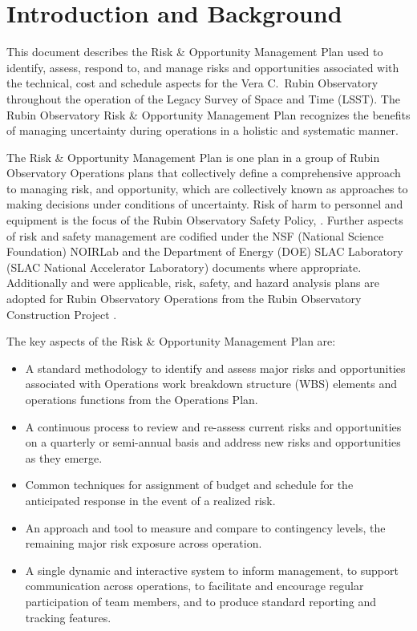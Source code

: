 \section{Introduction and Background}

This document describes the Risk \& Opportunity Management Plan used to identify, assess, respond to, and manage risks and opportunities associated with the technical, cost and schedule aspects for the Vera C.\ Rubin Observatory throughout the operation of the Legacy Survey of Space and Time (LSST).
The Rubin Observatory Risk \& Opportunity Management Plan recognizes the benefits of managing uncertainty during operations in a holistic and systematic manner.

The Risk \& Opportunity Management Plan is one plan in a group of Rubin Observatory Operations plans that collectively define a comprehensive approach to managing risk, and opportunity, which are collectively known as approaches to making decisions under conditions of uncertainty.
Risk of harm to personnel and equipment is the focus of the Rubin Observatory Safety Policy, .
Further aspects of risk and safety management are codified under the NSF (National Science Foundation) NOIRLab and the Department of Energy (DOE) SLAC Laboratory (SLAC National Accelerator Laboratory) documents where appropriate. 
Additionally and were applicable,  risk, safety, and hazard analysis plans are adopted for Rubin Observatory Operations from the Rubin Observatory Construction Project .

The key aspects of the Risk \& Opportunity Management Plan are:
\begin{itemize}
	\item A standard methodology to identify and assess major risks and opportunities associated with Operations work breakdown structure (WBS) elements and operations functions from the Operations Plan.

	\item A continuous process to review and re-assess current risks and opportunities on a quarterly or semi-annual basis and address new risks and opportunities as they emerge.
	
	\item Common techniques for assignment of budget and schedule for the anticipated response in the event of a realized risk.
	
	\item An approach and tool to measure and compare to contingency levels, the remaining major risk exposure across operation.
	
	\item A single dynamic and interactive system to inform management, to support communication across operations, to facilitate and encourage regular participation of team members, and to produce standard reporting and tracking features.
\end{itemize}


